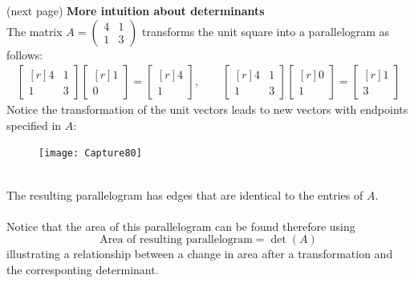 \documentclass{report}
\begin{document}
(next page)
\newpage
\noindent\textbf{More intuition about determinants}\\
The matrix $A=\left(\begin{smallmatrix}4&1\\1&3\end{smallmatrix}\right)$ 
transforms the unit square into a parallelogram as follows:
\begin{align*}
\begin{bmatrix*}[r]
4&1\\1&3
\end{bmatrix*}
\begin{bmatrix*}[r]
1\\0
\end{bmatrix*}
=\begin{bmatrix*}[r]
4\\1
\end{bmatrix*},\quad\quad
\begin{bmatrix*}[r]
4&1\\1&3
\end{bmatrix*}
\begin{bmatrix*}[r]
0\\1
\end{bmatrix*}
=\begin{bmatrix*}[r]
1\\3
\end{bmatrix*}
\end{align*}
Notice the transformation of the unit vectors leads to new vectors with endpoints
specified in $A$:
\begin{figure}[h]
\texttt{[image: Capture80]}\\
\centering
\end{figure}\\
The resulting parallelogram has edges that are identical to the entries of $A$.\\
\vspace{1mm}\\
Notice that the area of this parallelogram can be found therefore using
\begin{equation*}
\text{Area of resulting parallelogram}=\det(A)
\end{equation*}
illustrating a relationship between a change in area after a transformation 
and the corresponting determinant. 
\newpage
\end{document}
